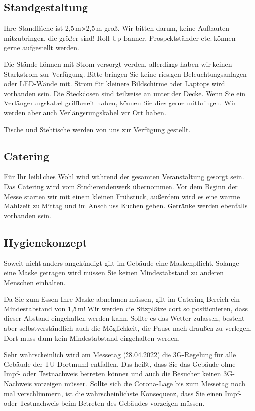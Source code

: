 \documentclass[
  paper=a4,
  fontsize=12pt,
  DIV=16,
  headheight=30pt,
  footheight=45pt,
  headinclude,
  parskip=half,
]{scrartcl}
\begin{document}
\subsection*{Standgestaltung}
Ihre Standfläche ist 2,5\,m$\times$2,5\,m groß.
Wir bitten darum, keine Aufbauten mitzubringen, die größer sind!
Roll-Up-Banner, Prospektständer etc. können gerne aufgestellt werden.

Die Stände können mit Strom versorgt werden, allerdings haben wir keinen Starkstrom zur Verfügung.
Bitte bringen Sie keine riesigen Beleuchtungsanlagen oder LED-Wände mit.
Strom für kleinere Bildschirme oder Laptops wird vorhanden sein.
Die Steckdosen sind teilweise an unter der Decke.
Wenn Sie ein Verlängerungskabel griffbereit haben, können Sie dies gerne mitbringen.
Wir werden aber auch Verlängerungskabel vor Ort haben.

Tische und Stehtische werden von uns zur Verfügung gestellt.


\subsection*{Catering}
Für Ihr leibliches Wohl wird während der gesamten Veranstaltung gesorgt sein.
Das Catering wird vom Studierendenwerk übernommen.
Vor dem Beginn der Messe starten wir mit einem kleinen Frühstück, außerdem wird es eine warme Mahlzeit zu Mittag und im Anschluss Kuchen geben.
Getränke werden ebenfalls vorhanden sein.


\subsection*{Hygienekonzept}
Soweit nicht anders angekündigt gilt im Gebäude eine Maskenpflicht.
Solange eine Maske getragen wird müssen Sie keinen Mindestabstand zu anderen Menschen einhalten.

Da Sie zum Essen Ihre Maske abnehmen müssen, gilt im Catering-Bereich ein Mindestabstand von 1,5\,m!
Wir werden die Sitzplätze dort so positionieren, dass dieser Abstand eingehalten werden kann.
Sollte es das Wetter zulassen, besteht aber selbstverständlich auch die Möglichkeit, die Pause nach draußen zu verlegen.
Dort muss dann kein Mindestabstand eingehalten werden.

Sehr wahrscheinlich wird am Messetag (28.04.2022) die 3G-Regelung für alle Gebäude der TU Dortmund entfallen.
Das heißt, dass Sie das Gebäude ohne Impf- oder Testnachweis betreten können und auch die Besucher keinen 3G-Nachweis vorzeigen müssen.
Sollte sich die Corona-Lage bis zum Messetag noch mal verschlimmern, ist die wahrscheinlichste Konsequenz, dass Sie einen Impf- oder Testnachweis beim Betreten des Gebäudes vorzeigen müssen.
\end{document}
